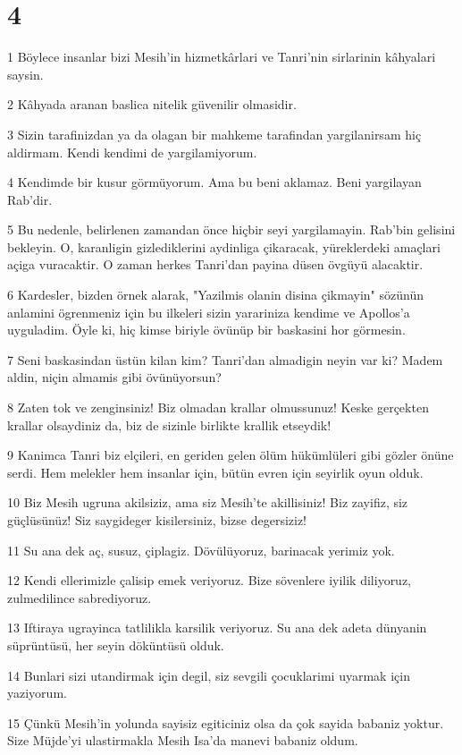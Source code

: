 \chapter{4}

\par 1 Böylece insanlar bizi Mesih'in hizmetkârlari ve Tanri'nin sirlarinin kâhyalari saysin.
\par 2 Kâhyada aranan baslica nitelik güvenilir olmasidir.
\par 3 Sizin tarafinizdan ya da olagan bir mahkeme tarafindan yargilanirsam hiç aldirmam. Kendi kendimi de yargilamiyorum.
\par 4 Kendimde bir kusur görmüyorum. Ama bu beni aklamaz. Beni yargilayan Rab'dir.
\par 5 Bu nedenle, belirlenen zamandan önce hiçbir seyi yargilamayin. Rab'bin gelisini bekleyin. O, karanligin gizlediklerini aydinliga çikaracak, yüreklerdeki amaçlari açiga vuracaktir. O zaman herkes Tanri'dan payina düsen övgüyü alacaktir.
\par 6 Kardesler, bizden örnek alarak, "Yazilmis olanin disina çikmayin" sözünün anlamini ögrenmeniz için bu ilkeleri sizin yarariniza kendime ve Apollos'a uyguladim. Öyle ki, hiç kimse biriyle övünüp bir baskasini hor görmesin.
\par 7 Seni baskasindan üstün kilan kim? Tanri'dan almadigin neyin var ki? Madem aldin, niçin almamis gibi övünüyorsun?
\par 8 Zaten tok ve zenginsiniz! Biz olmadan krallar olmussunuz! Keske gerçekten krallar olsaydiniz da, biz de sizinle birlikte krallik etseydik!
\par 9 Kanimca Tanri biz elçileri, en geriden gelen ölüm hükümlüleri gibi gözler önüne serdi. Hem melekler hem insanlar için, bütün evren için seyirlik oyun olduk.
\par 10 Biz Mesih ugruna akilsiziz, ama siz Mesih'te akillisiniz! Biz zayifiz, siz güçlüsünüz! Siz saygideger kisilersiniz, bizse degersiziz!
\par 11 Su ana dek aç, susuz, çiplagiz. Dövülüyoruz, barinacak yerimiz yok.
\par 12 Kendi ellerimizle çalisip emek veriyoruz. Bize sövenlere iyilik diliyoruz, zulmedilince sabrediyoruz.
\par 13 Iftiraya ugrayinca tatlilikla karsilik veriyoruz. Su ana dek adeta dünyanin süprüntüsü, her seyin döküntüsü olduk.
\par 14 Bunlari sizi utandirmak için degil, siz sevgili çocuklarimi uyarmak için yaziyorum.
\par 15 Çünkü Mesih'in yolunda sayisiz egiticiniz olsa da çok sayida babaniz yoktur. Size Müjde'yi ulastirmakla Mesih Isa'da manevi babaniz oldum.

